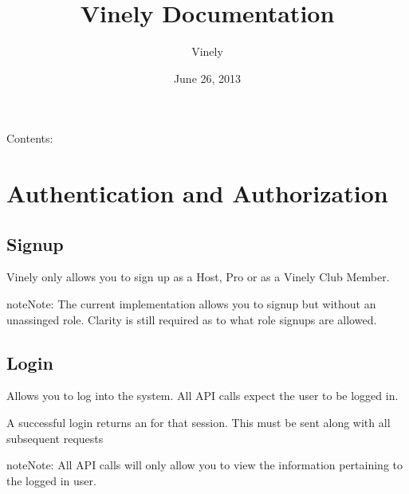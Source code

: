 \documentclass[letterpaper,10pt,english]{sphinxmanual}
\title{Vinely Documentation}
\date{June 26, 2013}
\author{Vinely}
\begin{document}
\maketitle
\tableofcontents
{}\label{index::doc}


Contents:


\chapter{Authentication and Authorization}
\label{auth:authentication-and-authorization}\label{auth:welcome-to-vinely-s-documentation}\label{auth::doc}\label{auth:ref-auth}

\section{Signup}
\label{auth:signup}
Vinely only allows you to sign up as a Host, Pro or as a Vinely Club Member.


\begin{fulllineitems}
\label{auth:post--api-v1-auth-signup-}
\end{fulllineitems}


\begin{notice}{note}{Note:}
The current implementation allows you to signup but without an unassinged role.
Clarity is still required as to what role signups are allowed.
\end{notice}


\section{Login}
\label{auth:login}
Allows you to log into the system. All API calls expect the user to be logged in.


\begin{fulllineitems}
\label{auth:post--api-v1-auth-login-}
\end{fulllineitems}


A successful login returns an  for that session. This  must be sent along with
all subsequent requests

\begin{notice}{note}{Note:}
All API calls will only allow you to view the information pertaining to the logged in user.
\end{notice}
\end{document}
